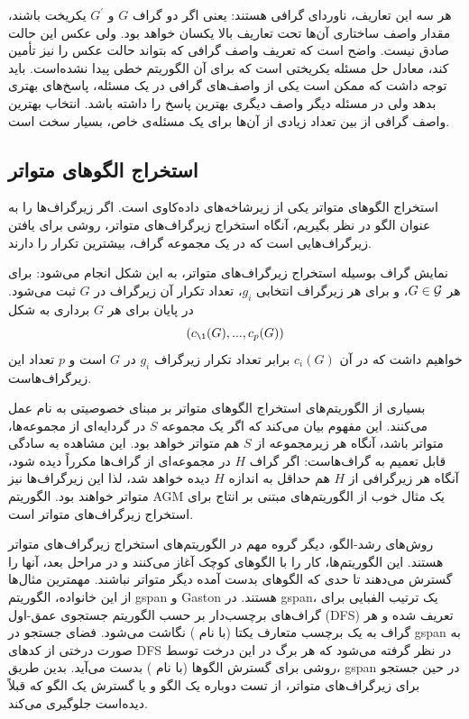 هر سه این تعاریف، ناوردای گرافی هستند: یعنی اگر دو گراف $G$ و $G^\prime$ یکریخت باشند، مقدار واصف ساختاری آن‌ها تحت تعاریف بالا یکسان خواهد بود. ولی عکس این حالت صادق نیست. واضح است که تعریف واصف گرافی که بتواند حالت عکس را نیز تأمین کند، معادل حل مسئله یکریختی است که برای آن الگوریتم خطی پیدا نشده‌است.  باید توجه داشت که ممکن است یکی از واصف‌های گرافی در یک مسئله، پاسخ‌های بهتری بدهد ولی در مسئله دیگر واصف دیگری بهترین پاسخ را داشته باشد. انتخاب بهترین واصف گرافی از بین تعداد زیادی از آن‌ها برای یک مسئله‌ی خاص، بسیار سخت است.

\subsection{استخراج الگو‌های متواتر}
استخراج الگوهای متواتر یکی از زیرشاخه‌های داده‌کاوی است. اگر زیرگراف‌ها را به عنوان الگو در نظر بگیریم، آنگاه استخراج زیرگراف‌های متواتر، روشی برای یافتن زیرگراف‌هایی است که در یک مجموعه گراف، بیشترین تکرار را دارند.

نمایش گراف بوسیله استخراج زیرگراف‌های متواتر، به این شکل انجام می‌شود: برای هر $G \in \mathcal{G}$، و برای هر زیرگراف انتخابی $g_i$، تعداد تکرار آن زیرگراف در $G$ ثبت می‌شود. در پایان برای هر $G$ برداری به شکل
\begin{equation*}
(c_\1(G),...,c_p(G))
\end{equation*}
خواهیم داشت که در آن $c_i(G)$ برابر تعداد تکرار زیرگراف $g_i$ در $G$ است و $p$ تعداد این زیرگراف‌هاست.

بسیاری از الگوریتم‌های استخراج الگوهای متواتر بر مبنای خصوصیتی به نام  عمل می‌کنند. این مفهوم بیان می‌کند که اگر یک مجموعه $S$ در گردایه‌ای از مجموعه‌ها، متواتر باشد، آنگاه هر زیرمجموعه از $S$ هم متواتر خواهد بود. این مشاهده به سادگی قابل تعمیم به گراف‌هاست: اگر گراف $H$ در مجموعه‌ای از گراف‌ها مکرراً دیده شود، آنگاه هر زیرگرافی از $H$ هم حداقل به اندازه $H$ دیده خواهد شد، لذا این زیرگراف‌ها نیز متواتر خواهند بود. الگوریتم AGM  یک مثال خوب از الگوریتم‌های مبتنی بر انتاج برای استخراج زیرگراف‌های متواتر است.

روش‌های رشد-الگو، دیگر گروه مهم در الگوریتم‌های استخراج زیرگراف‌های متواتر هستند. این الگوریتم‌ها، کار را با الگوهای کوچک آغاز می‌کنند و در مراحل بعد، آنها را گسترش می‌دهند تا حدی که الگوهای بدست آمده دیگر متواتر نباشند. مهمترین مثال‌ها از این خانواده، الگوریتم gspan  و Gaston  هستند. در gspan، یک ترتیب الفبایی برای گراف‌های برچسب‌دار بر حسب الگوریتم جستجوی عمق-اول (DFS) تعریف شده و هر گراف به یک برچسب متعارف یکتا (با نام ) نگاشت می‌شود. فضای جستجو در gspan به صورت درختی از کدهای DFS در نظر گرفته می‌شود که هر برگ در این درخت توسط روشی برای گسترش الگوها (با نام ) بدست می‌آید. بدین طریق، gspan در حین جستجو برای زیرگراف‌های متواتر، از تست دوباره یک الگو و یا گسترش یک الگو که قبلاً دیده‌است جلوگیری می‌کند.

